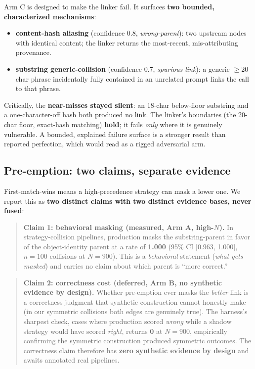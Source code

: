 \documentclass[11pt]{article}
\begin{document}
Arm C is designed to make the linker fail. It surfaces \textbf{two bounded, characterized mechanisms}:
\begin{itemize}[leftmargin=*]
\item \textbf{content-hash aliasing} (confidence 0.8, \emph{wrong-parent}): two upstream nodes with
identical content; the linker returns the most-recent, mis-attributing provenance.
\item \textbf{substring generic-collision} (confidence 0.7, \emph{spurious-link}): a generic
$\geq$20-char phrase incidentally fully contained in an unrelated prompt links the call to that phrase.
\end{itemize}
Critically, the \textbf{near-misses stayed silent}: an 18-char below-floor substring and a one-character-off
hash both produced no link. The linker's boundaries (the 20-char floor, exact-hash matching) \textbf{hold};
it fails \emph{only} where it is genuinely vulnerable. A bounded, explained failure surface is a stronger
result than reported perfection, which would read as a rigged adversarial arm.

\subsection{Pre-emption: two claims, separate evidence}

First-match-wins means a high-precedence strategy can mask a lower one. We report this as \textbf{two
distinct claims with two distinct evidence bases, never fused}:

\begin{quote}
\textbf{Claim 1: behavioral masking (measured, Arm A, high-$N$).} In strategy-collision pipelines,
production masks the substring-parent in favor of the object-identity parent at a rate of \textbf{1.000}
(95\% CI [0.963, 1.000], $n=100$ collisions at $N=900$). This is a \emph{behavioral} statement (\emph{what gets masked}) and carries no claim about which parent is ``more correct.''
\end{quote}

\begin{quote}
\textbf{Claim 2: correctness cost (deferred, Arm B, no synthetic evidence by design).} Whether
pre-emption ever masks the \emph{better} link is a correctness judgment that synthetic construction cannot
honestly make (in our symmetric collisions both edges are genuinely true). The harness's sharpest check, cases where production scored \emph{wrong} while a shadow strategy would have scored \emph{right}, returns
\textbf{0} at $N=900$, empirically confirming the symmetric construction produced symmetric outcomes. The
correctness claim therefore has \textbf{zero synthetic evidence by design} and awaits annotated real
pipelines.
\end{quote}
\end{document}
